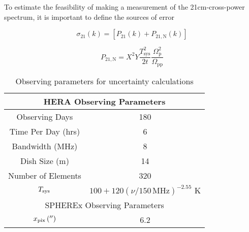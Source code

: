 To estimate the feasibility of making a measurement of the 21cm-\lya cross-power
spectrum, it is important to define the sources of error

\begin{equation}
\sigma_{21} \left(k \right) = \left[ P_{21} \left(k \right) + P_{21, \textrm{N}} \left(k \right) \right]
\end{equation}

\begin{equation}
P_{21, \textrm{N}} = X^2 Y \frac{T^2_{\textrm{sys}}}{2 t} \frac{\Omega_{\textrm{p}}^2}{\Omega_{\textrm{pp}}}
\end{equation}

\begin{table}[]
\caption{Observing parameters for uncertainty calculations}
\centering
\begin{tabular}{cc}
\hline
\multicolumn{2}{c}{HERA Observing Parameters}                                                                                                                \\ \hline
\multicolumn{1}{c|}{Observing Days}                                                         & 180                                                            \\
\multicolumn{1}{c|}{Time Per Day (hrs)}                                                     & 6                                                              \\
\multicolumn{1}{c|}{Bandwidth (MHz)}                                                        & 8                                                              \\
\multicolumn{1}{c|}{Dish Size (m)}                                                          & 14                                                             \\
\multicolumn{1}{c|}{Number of Elements}                                                     & 320                                                            \\
\multicolumn{1}{c|}{$T_{\rm sys}$}                                                          & $100 + 120 \left( \nu / 150 \, \textrm{MHz} \right)^{-2.55}$ K \\ \hline
\multicolumn{2}{c}{SPHEREx Observing Parameters}                                                                                                             \\ \hline
\multicolumn{1}{c|}{$x_{\rm pix} \left( '' \right)$}                                        & 6.2                                                            \\

\end{tabular}
\end{table}
